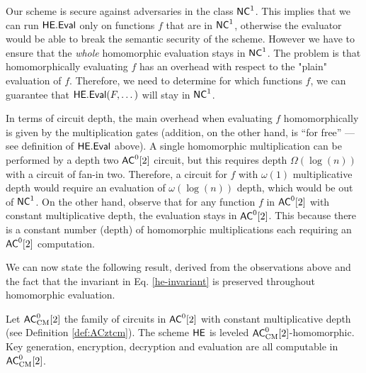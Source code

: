 Our scheme is secure against adversaries in the class ${\mathsf{NC}}^1$. This implies that we can run $\mathsf{HE.Eval}$ only on functions $f$ that are in ${\mathsf{NC}}^1$, otherwise the evaluator would be able to break the semantic security of the scheme.
However we have to ensure that the \textit{whole} homomorphic evaluation stays in ${\mathsf{NC}}^1$. The problem is that homomorphically evaluating $f$ has an overhead with respect to the "plain" evaluation of $f$. Therefore, we need to determine 
for which functions $f$, we can guarantee that 
$\mathsf{HE.Eval}(F, \dots)$ will stay in ${\mathsf{NC}}^1$. 

In terms of circuit depth, the main overhead when evaluating $f$ homomorphically is given by the multiplication gates (addition, on the other hand, is ``for free'' --- see definition of $\mathsf{HE.Eval}$ above). A single homomorphic multiplication can be performed by a depth two ${\mathsf{AC}}^0[2]$ circuit, but this requires depth $\Omega(\log(n))$ with a circuit of fan-in two. Therefore, a circuit for $f$ with $\omega(1)$ multiplicative depth would require an evaluation of $\omega(\log(n))$ depth, which would be out of ${\mathsf{NC}}^1$. On the other hand, observe that for any function $f$ in ${\mathsf{AC}}^0[2]$ with constant multiplicative depth, the evaluation stays in ${\mathsf{AC}}^0[2]$. This because there is a constant number (depth) of homomorphic multiplications each requiring an ${\mathsf{AC}}^0[2]$ computation. 

We can now state the following result, derived from the observations above and the fact that the invariant in Eq. \ref{he-invariant} is preserved throughout homomorphic evaluation.

\begin{theorem}
\label{thm:he-homomorphic}
Let ${\mathsf{AC}}^0_{\text{CM}}[2]$ the family of circuits in ${\mathsf{AC}}^0[2]$ with constant multiplicative depth (see Definition \ref{def:ACztcm}).
The scheme $\mathsf{HE}$ is leveled ${\mathsf{AC}}^0_{\text{CM}}[2]$-homomorphic. Key generation, encryption, decryption and evaluation are all computable in ${\mathsf{AC}}^0_{\text{CM}}[2]$. 
\end{theorem}

